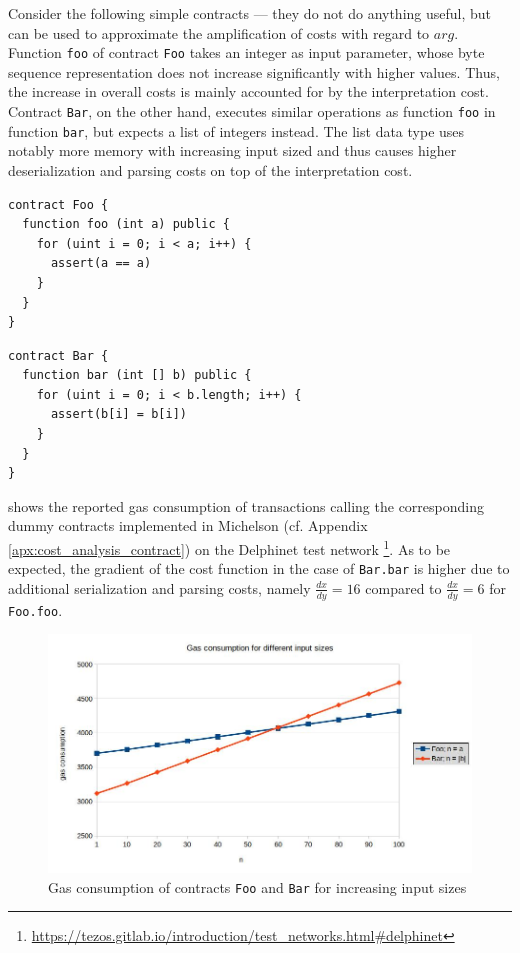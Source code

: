 Consider the following simple contracts --- they do not do anything useful, but can be used to approximate the amplification of costs with regard to $arg$. Function \texttt{foo} of contract \texttt{Foo} takes an integer as input parameter, whose byte sequence representation does not increase significantly with higher values. Thus, the increase in overall costs is mainly accounted for by the interpretation cost. Contract \texttt{Bar}, on the other hand, executes similar operations as function \texttt{foo} in function \texttt{bar}, but expects a list of integers instead. The list data type uses notably more memory with increasing input sized and thus causes higher deserialization and parsing costs on top of the interpretation cost. 
\begin{lstlisting}[numbers=none, language=Solidity, caption=Simple dummy contract expecting an integer and executing a loop]
contract Foo {
  function foo (int a) public {
    for (uint i = 0; i < a; i++) {
      assert(a == a)
    }
  }
}
\end{lstlisting}
\begin{lstlisting}[numbers=none, language=Solidity, caption=Simple dummy contract expecting iterating over a list]
contract Bar {
  function bar (int [] b) public {
    for (uint i = 0; i < b.length; i++) {
      assert(b[i] = b[i])
    }
  }
}
\end{lstlisting}

 shows the reported gas consumption of transactions calling the corresponding dummy contracts implemented in Michelson (cf. Appendix \ref{apx:cost_analysis_contract}) on the Delphinet test network \footnote{\url{https://tezos.gitlab.io/introduction/test_networks.html\#delphinet}}. As to be expected, the gradient of the cost function in the case of \texttt{Bar.bar} is higher due to additional serialization and parsing costs, namely $\frac{dx}{dy} = 16$ compared to $\frac{dx}{dy} = 6$ for \texttt{Foo.foo}.
\begin{figure}[h]
\centering
\includegraphics[width=0.9\linewidth]{figures/2-use_cases/cost_analysis}
\caption{Gas consumption of contracts \texttt{Foo} and \texttt{Bar} for increasing input sizes}
\label{fig:use_case_cost}
\end{figure}

